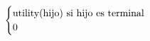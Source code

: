 \documentclass[preview]{standalone}
\begin{document}
\begin{align*}
\begin{cases}\text{utility(hijo) si hijo es terminal} \cr
                                 0 \cr
                                 \end{cases}
\end{align*}
\end{document}
